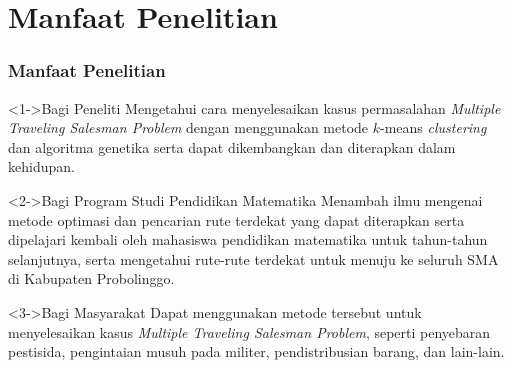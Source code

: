 \section{Manfaat Penelitian}
\begin{frame}
\frametitle{Manfaat Penelitian}

\begin{block}<1->{Bagi Peneliti}
Mengetahui cara menyelesaikan kasus permasalahan \textit{Multiple Traveling Salesman Problem} dengan menggunakan metode $k$-means \textit{clustering} dan algoritma genetika serta dapat dikembangkan dan diterapkan dalam kehidupan.
\end{block}

\begin{block}<2->{Bagi Program Studi Pendidikan Matematika}
Menambah ilmu mengenai metode optimasi dan pencarian rute terdekat yang dapat diterapkan serta dipelajari kembali oleh mahasiswa pendidikan matematika untuk tahun-tahun selanjutnya, serta mengetahui rute-rute terdekat untuk menuju ke seluruh SMA di Kabupaten Probolinggo.
\end{block}

\begin{block}<3->{Bagi Masyarakat}
Dapat menggunakan metode tersebut untuk menyelesaikan kasus \textit{Multiple Traveling Salesman Problem}, seperti penyebaran pestisida, pengintaian musuh pada militer, pendistribusian barang, dan lain-lain.
\end{block}
\end{frame}